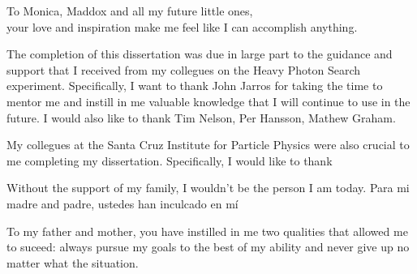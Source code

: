 \documentclass[12pt]{ucthesis}
\begin{document}

\begin{frontmatter}

    \maketitle
    \copyrightpage
    
    \tableofcontents
    \listoffigures
    \listoftables

    \begin{abstract}
        
    \end{abstract}

    \begin{dedication}
        \null\vfil
        {
            \begin{center}
                To Monica, Maddox and all my future little ones, \\
                your love and inspiration make me feel like I can accomplish anything.
            \end{center}
        }
        \vfil\null
    \end{dedication}

    \begin{acknowledgements}
        The completion of this dissertation was due in large part to the guidance
        and support that I received from my collegues on the Heavy Photon Search
        experiment.  Specifically, I want to thank John Jarros for taking the
        time to mentor me and instill in me valuable knowledge that I will
        continue to use in the future.  I would also like to thank Tim Nelson, 
        Per Hansson, Mathew Graham.

        My collegues at the Santa Cruz Institute for Particle Physics were also
        crucial to me completing my dissertation.  Specifically, I would like to
        thank

        Without the support of my family, I wouldn't be the person I am today.
        Para mi madre and padre, ustedes han inculcado en m\'{i}  

        To my father and mother, you have instilled in me two qualities that 
        allowed me to suceed: always pursue my goals to the best of my ability
        and never give up no matter what the situation.
    \end{acknowledgements}

\end{frontmatter}
\end{document}
